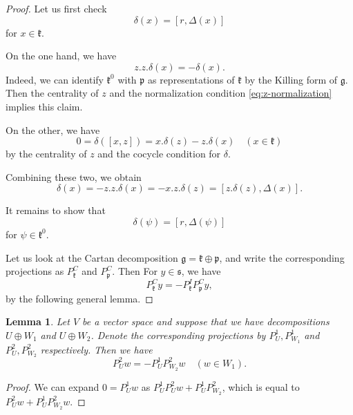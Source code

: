 \documentclass[a4paper,11pt]{amsart}
\newcommand{\fr}[1]{\mathfrak{#1}}
\newcommand{\ad}{\mathrm{ad}}
\newtheorem{lem}[thm]{Lemma}
\theoremstyle{definition}
\theoremstyle{remark}
\begin{document}
\begin{proof}
Let us first check
\[
\delta(x) = \left[ r , \Delta(x) \right]
\]
for $x \in \fr{k}$.

On the one hand, we have
\[
z. z. \delta(x) = - \delta(x).
\]
Indeed, we can identify $\fr{k}^0$ with $\fr{p}$ as representations of $\fr{k}$ by the Killing form of $\fr{g}$.
Then the centrality of $z$ and the normalization condition \eqref{eq:z-normalization} implies this claim.

On the other, we have
\[
0 = \delta\mathopen{}\left( \left[ x,z \right] \right) = x.\delta(z) - z.\delta(x) \quad (x \in \fr k)
\]
by the centrality of $z$ and the cocycle condition for $\delta$.

Combining these two, we obtain
\[
\delta(x) = - z. z. \delta(x) = - x. z. \delta(z) = \left[ z.\delta(z) , \Delta(x) \right] .
\]

It remains to show that
\[
\delta(\psi) = \left[ r , \Delta(\psi) \right]
\]
for $\psi\in\fr{k}^0$.

Let us look at the Cartan decomposition $\fr g = \fr k \oplus \fr p$, and write the corresponding projections as $P^C_{\fr k}$ and $P^C_{\fr{p}}$.
Then For $y \in \fr s$, we have
\[
P^C_{\fr k} y = - P^I_{\fr k} P^C_{\fr p} y ,
\]
by the following general lemma.
\renewcommand{\qedsymbol}{}
\end{proof}

\begin{lem}
\label{lem:PCk-is-PIk-PCp}
Let $V$ be a vector space and suppose that we have decompositions $U \oplus W_1$ and $U \oplus W_2$.
Denote the corresponding projections by $P^1_U, P^1_{W_1}$ and $P^2_U, P^2_{W_2}$ respectively.
Then we have
\begin{equation*}
 P^2_U w = - P^1_U P^2_{W_2} w \quad (w \in W_1).
\end{equation*}
\end{lem}

\begin{proof}
We can expand $0 = P^1_U w$ as $P^1_U P^2_U w + P^1_U P^2_{W_2}$, which is equal to $P^2_U w + P^1_U P^2_{W_2} w$.
\end{proof}
\end{document}
